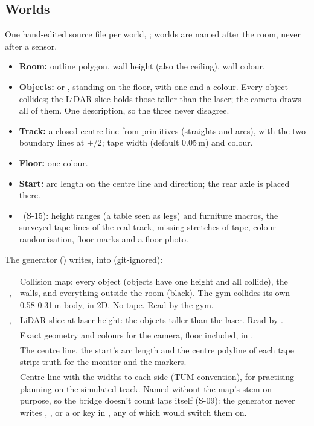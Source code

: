 \documentclass[11pt,a4paper]{article}
\newcommand{\deferred}{\target{Deferred}}
\begin{document}
\subsection{Worlds}\label{sec:world}
One hand-edited source file per world, ; worlds are named after the room, never after a sensor.
\begin{itemize}
  \item \textbf{Room:} outline polygon, wall height (also the ceiling), wall colour.
  \item \textbf{Objects:}  or , standing on the floor, with one  and a colour. Every object collides; the LiDAR slice holds those taller than the laser; the camera draws all of them. One description, so the three never disagree.
  \item \textbf{Track:} a closed centre line from primitives (straights and arcs), with the two boundary lines at $\pm$/2; tape width (default 0.05\,m) and colour.
  \item \textbf{Floor:} one colour.
  \item \textbf{Start:} arc length on the centre line and direction; the rear axle is placed there.
  \item \deferred\ (S-15): height ranges (a table seen as legs) and furniture macros, the surveyed tape lines of the real track, missing stretches of tape, colour randomisation, floor marks and a floor photo.
\end{itemize}

The generator () writes, into  (git-ignored):

\begin{tabularx}{\textwidth}{@{}L{3.6cm} Y@{}}
\toprule
{} &  \\
\midrule
\endhead
{},  & Collision map: every object (objects have one height and all collide), the walls, and everything outside the room (black). The gym collides its own 0.58\,\x\,0.31\,m body, in 2D. No tape. Read by the gym. \\
,  & LiDAR slice at laser height: the objects taller than the laser. Read by . \\
 & Exact geometry and colours for the camera, floor included, in . \\
 & The centre line, the start's arc length and the centre polyline of each tape strip: truth for the monitor and the markers. \\
 & Centre line with the widths to each side (TUM convention), for practising planning on the simulated track. Named without the map's stem on purpose, so the bridge doesn't count laps itself (S-09): the generator never writes , , or a  or  key in , any of which would switch them on. \\
\bottomrule
\end{tabularx}
\end{document}
